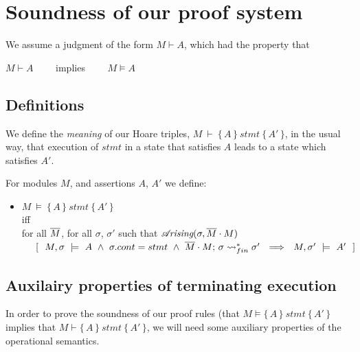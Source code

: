 


\section{Soundness of our proof system}

\begin{axiom}
We assume a judgment of the form $M \vdash A$, which had the property that\\
\strut \hspace{5cm} $M \vdash A $ \ \ \ \ implies \ \ \ \ $M \vDash A$
\end{axiom}

\subsection{Definitions}

We  define the {\emph {meaning}} of  our Hoare triples, $M\ \vdash\  \{\, A \,  \}\ stmt\  \{\, A' \, \}$,  in the usual way, \ie that execution of $stmt$ in a state that satisfies $A$ leads to a state which satisfies $A'$. 

 
\begin{definition}

 
For modules $M$, and assertions $A$, $A'$   we define:
\begin{itemize}
\item
$M\ \models\  \{\, A \,  \}\ stmt\  \{\, A' \, \}$ \\
iff\\
 for   all $\overline{M}$, for all $\sigma$, $\sigma'$ such that {$\mathcal{A}\!\textit{rising}(\sigma, \overline{M}\cdot M)$}\\
$\strut ~ ~ ~ ~ [ \ \ M,\sigma \ \models \ A \ \wedge\  
 \sigma.cont = stmt  \ \wedge\     \leadstoBoundedStarFin {\Mtwo\cdot M}  {\sigma}  {\sigma'}    \ \ \Longrightarrow\ \ M,\sigma' \ \models \ A'\ \ ]$
\end{itemize}
\end{definition}
 

  
 
\subsection{Auxilairy properties of terminating execution} 
 In order to prove the soundness of our proof rules (\ie that $M \models  \{\, A \,  \}\ stmt\  \{\, A' \, \}$ implies that $M \vdash  \{\, A \,  \}\ stmt\  \{\, A' \, \}$, we will need some auxiliary properties of the operational semantics.
 
